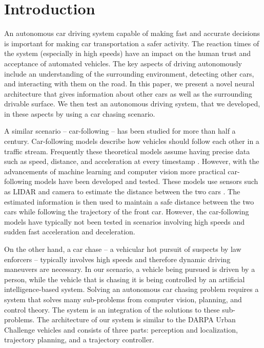 \documentclass{ctuthesis/ctuthesis}
\begin{document}
\maketitle

\chapter{Introduction}
An autonomous car driving system capable of making fast and accurate decisions is important for making car transportation a safer activity. The reaction times of the system (especially in high speeds) have an impact on the human trust and acceptance of automated vehicles. The key aspects of driving autonomously include an understanding of the surrounding environment, detecting other cars, and interacting with them on the road. In this paper, we present a novel neural architecture that gives information about other cars as well as the surrounding drivable surface. We then test an autonomous driving system, that we developed, in these aspects by using a car chasing scenario. \par


A similar scenario -- car-following -- has been studied for more than half a century. Car-following models describe how vehicles should follow each other in a traffic stream. Frequently these theoretical models assume having precise data such as speed, distance, and acceleration at every timestamp \cite{car_following}. However, with the advancements of machine learning and computer vision more practical car-following models have been developed and tested. These models use sensors such as LIDAR and camera to estimate the distance between the two cars \cite{lidar_highway}. The estimated information is then used to maintain a safe distance between the two cars while following the trajectory of the front car. However, the car-following models have typically not been tested in scenarios involving high speeds and sudden fast acceleration and deceleration. \par
 
 
On the other hand, a car chase -- a vehicular hot pursuit of suspects by law enforcers -- typically involves high speeds and therefore dynamic driving maneuvers are necessary. In our scenario, a vehicle being pursued is driven by a person, while the vehicle that is chasing it is being controlled by an artificial intelligence-based system. Solving an autonomous car chasing problem requires a system that solves many sub-problems from computer vision, planning, and control theory. The system is an integration of the solutions to these sub-problems. The architecture of our system is similar to the DARPA Urban Challenge vehicles \cite{Bertha,darpa2,darpa_book} and consists of three parts: perception and localization, trajectory planning, and a trajectory controller. \par
\end{document}
